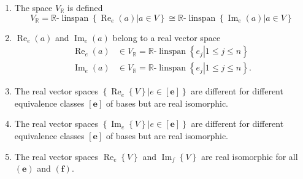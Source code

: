 \documentclass[aps,preprint]{revtex4}%
\begin{document}
\begin{enumerate}
\begin{enumerate}
\item The space $V_{\mathbb{R}}$ is defined
\begin{equation}
V_{\mathbb{R}}=\mathbb{R}\text{-}\operatorname*{linspan}\left\{  \left.
\operatorname{Re}_{e}\left(  a\right)  \right\vert a\in V\right\}
\cong\mathbb{R}\text{-}\operatorname*{linspan}\left\{  \left.
\operatorname{Im}_{e}\left(  a\right)  \right\vert a\in V\right\}
\end{equation}


\item $\operatorname{Re}_{e}\left(  a\right)  $ and $\operatorname{Im}%
_{e}\left(  a\right)  $ belong to a real vector space
\begin{align}
\operatorname{Re}_{e}\left(  a\right)   &  \in V_{\mathbb{R}}=\mathbb{R}%
\text{-}\operatorname*{linspan}\left\{  \left.  e_{j}\right\vert 1\leq j\leq
n\right\} \\
\operatorname{Im}_{e}\left(  a\right)   &  \in V_{\mathbb{R}}=\mathbb{R}%
\text{-}\operatorname*{linspan}\left\{  \left.  e_{j}\right\vert 1\leq j\leq
n\right\}  .
\end{align}


\item The real vector spaces $\left\{  \left.  \operatorname{Re}_{e}\left\{
V\right\}  \right\vert e\in\left[  \boldsymbol{e}\right]  \right\}  $ are
different for different equivalence classes $\left[  \boldsymbol{e}\right]  $
of bases but are real isomorphic.

\item The real vector spaces $\left\{  \left.  \operatorname{Im}_{e}\left\{
V\right\}  \right\vert e\in\left[  \boldsymbol{e}\right]  \right\}  $ are
different for different equivalence classes $\left[  \boldsymbol{e}\right]  $
of bases but are real isomorphic.

\item The real vector spaces $\operatorname{Re}_{e}\left\{  V\right\}  $ and
$\operatorname{Im}_{f}\left\{  V\right\}  $ are real isomorphic for all
$\left(  \boldsymbol{e}\right)  $ and $\left(  \boldsymbol{f}\right)  .$
\end{enumerate}


\end{enumerate}
\end{document}
